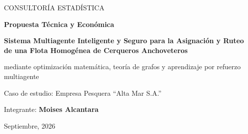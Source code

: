 \documentclass[12pt,a4paper]{article}
\begin{document}
\begin{titlepage}
\thispagestyle{empty}
\begin{center}
\vspace*{1.3cm}
{\Large CONSULTORÍA ESTADÍSTICA}\par
\vfill
{\Huge\bfseries Propuesta Técnica y Económica}\par
\vspace{0.5cm}
{\LARGE\bfseries Sistema Multiagente Inteligente y Seguro para la Asignación y Ruteo de una Flota Homogénea de Cerqueros Anchoveteros}\par
\vspace{0.35cm}
{\large mediante optimización matemática, teoría de grafos y aprendizaje por refuerzo multiagente}\par
\vspace{0.9cm}
{\large Caso de estudio: Empresa Pesquera ``Alta Mar S.A.''}\par
\vfill
{\large Integrante: \textbf{Moises Alcantara}}\par
\vspace{1cm}
{\large Septiembre, 2026}\par
\end{center}
\end{titlepage}
\tableofcontents
\newpage






\end{document}
